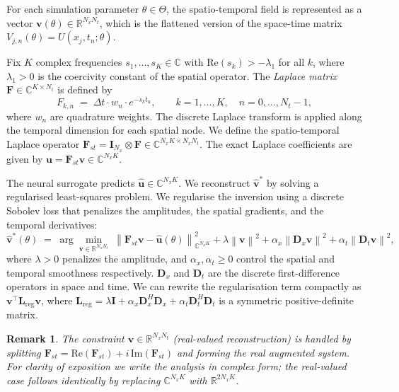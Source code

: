 \documentclass[11pt, a4paper]{article}
\newtheorem{remark}[theorem]{Remark}
\newcommand{\R}{\mathbb{R}}
\newcommand{\C}{\mathbb{C}}
\newcommand{\norm}[1]{\left\|#1\right\|}
\begin{document}
For each simulation parameter $\theta \in \Theta$, the spatio-temporal field
is represented as a vector $\mathbf{v}(\theta) \in \R^{N_x N_t}$,
which is the flattened version of the space-time matrix $V_{j,n}(\theta) = U(x_j, t_n;\theta)$.

Fix $K$ complex frequencies $s_1,\ldots,s_K \in \C$ with
$\mathrm{Re}(s_k) > -\lambda_1$ for all $k$, where $\lambda_1 > 0$ is the
coercivity constant of the spatial operator. The \emph{Laplace matrix} $\mathbf{F} \in \C^{K \times N_t}$ is defined by
\begin{equation}
  \label{eq:F_def}
  F_{k,n} \;=\; \Delta t \cdot w_n \cdot e^{-s_k t_n},
  \qquad k = 1,\ldots,K,\quad n = 0,\ldots,N_t-1,
\end{equation}
where $w_n$ are quadrature weights. The discrete Laplace transform is applied along the temporal dimension for each spatial node. We define the spatio-temporal Laplace operator $\mathbf{F}_{st} = \mathbf{I}_{N_x} \otimes \mathbf{F} \in \C^{N_x K \times N_x N_t}$. The exact Laplace coefficients are given by $\mathbf{u} = \mathbf{F}_{st}\mathbf{v} \in \C^{N_x K}$.

The neural surrogate predicts $\hat{\mathbf{u}} \in \C^{N_x K}$.
We reconstruct $\hat{\mathbf{v}}^*$ by solving a
regularised least-squares problem. We regularise the inversion using a discrete Sobolev loss that penalizes the amplitudes, the spatial gradients, and the temporal derivatives:
\begin{equation}
  \label{eq:inv_problem}
  \hat{\mathbf{v}}^*(\theta)
  \;=\;
  \arg\min_{\mathbf{v} \in \R^{N_x N_t}}
  \;\norm{\mathbf{F}_{st}\mathbf{v} - \hat{\mathbf{u}}(\theta)}_{\C^{N_x K}}^2
  + \lambda \norm{\mathbf{v}}^2 + \alpha_x \norm{\mathbf{D}_x\mathbf{v}}^2 + \alpha_t \norm{\mathbf{D}_t\mathbf{v}}^2,
\end{equation}
where $\lambda > 0$ penalizes the amplitude, and $\alpha_x, \alpha_t \geq 0$ control the spatial and temporal smoothness respectively. $\mathbf{D}_x$ and $\mathbf{D}_t$ are the discrete first-difference operators in space and time. We can rewrite the regularisation term compactly as $\mathbf{v}^\top \mathbf{L}_{\mathrm{reg}} \mathbf{v}$, where $\mathbf{L}_{\mathrm{reg}} = \lambda \mathbf{I} + \alpha_x \mathbf{D}_x^H\mathbf{D}_x + \alpha_t \mathbf{D}_t^H\mathbf{D}_t$ is a symmetric positive-definite matrix.

\begin{remark}
  The constraint $\mathbf{v} \in \R^{N_x N_t}$ (real-valued reconstruction) is
  handled by splitting $\mathbf{F}_{st} = \mathrm{Re}(\mathbf{F}_{st}) + i\,\mathrm{Im}(\mathbf{F}_{st})$
  and forming the real augmented system.
  For clarity of exposition we write the analysis in complex form; the
  real-valued case follows identically by replacing $\C^{N_x K}$ with $\R^{2 N_x K}$.
\end{remark}
\end{document}
